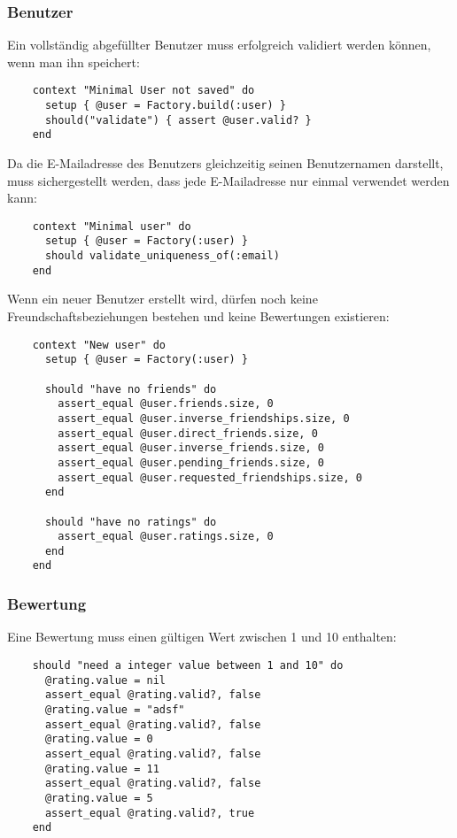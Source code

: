 \subsubsection{Benutzer}
Ein vollständig abgefüllter Benutzer muss erfolgreich validiert werden können,
wenn man ihn speichert:

\begin{verbatim}
    context "Minimal User not saved" do
      setup { @user = Factory.build(:user) }
      should("validate") { assert @user.valid? }
    end
\end{verbatim}

Da die E-Mailadresse des Benutzers gleichzeitig seinen Benutzernamen darstellt,
muss sichergestellt werden, dass jede E-Mailadresse nur einmal verwendet werden
kann:

\begin{verbatim}
    context "Minimal user" do
      setup { @user = Factory(:user) }
      should validate_uniqueness_of(:email)
    end
\end{verbatim}

Wenn ein neuer Benutzer erstellt wird, dürfen noch keine Freundschaftsbeziehungen
bestehen und keine Bewertungen existieren:

\begin{verbatim}
    context "New user" do
      setup { @user = Factory(:user) }

      should "have no friends" do
        assert_equal @user.friends.size, 0
        assert_equal @user.inverse_friendships.size, 0
        assert_equal @user.direct_friends.size, 0
        assert_equal @user.inverse_friends.size, 0
        assert_equal @user.pending_friends.size, 0
        assert_equal @user.requested_friendships.size, 0
      end

      should "have no ratings" do
        assert_equal @user.ratings.size, 0
      end
    end
\end{verbatim}

\subsubsection{Bewertung}
Eine Bewertung muss einen gültigen Wert zwischen 1 und 10 enthalten:

\begin{verbatim}
    should "need a integer value between 1 and 10" do
      @rating.value = nil
      assert_equal @rating.valid?, false
      @rating.value = "adsf"
      assert_equal @rating.valid?, false
      @rating.value = 0
      assert_equal @rating.valid?, false
      @rating.value = 11
      assert_equal @rating.valid?, false
      @rating.value = 5
      assert_equal @rating.valid?, true
    end
\end{verbatim}

